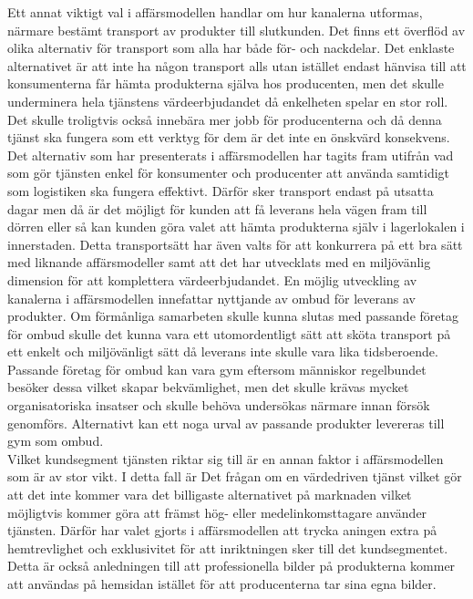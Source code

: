 \documentclass[10pt,a4paper,oneside]{article}
\begin{document}
Ett annat viktigt val i affärsmodellen handlar om hur kanalerna utformas, närmare bestämt transport av produkter till slutkunden. Det finns ett överflöd av olika alternativ för transport som alla har både för- och nackdelar. Det enklaste alternativet är att inte ha någon transport alls utan istället endast hänvisa till att konsumenterna får hämta produkterna själva hos producenten, men det skulle underminera hela tjänstens värdeerbjudandet då enkelheten spelar en stor roll. Det skulle troligtvis också innebära mer jobb för producenterna och då denna tjänst ska fungera som ett verktyg för dem är det inte en önskvärd konsekvens. Det alternativ som har presenterats i affärsmodellen har tagits fram utifrån vad som gör tjänsten enkel för konsumenter och producenter att använda samtidigt som logistiken ska fungera effektivt. Därför sker transport endast på utsatta dagar men då är det möjligt för kunden att få leverans hela vägen fram till dörren eller så kan kunden göra valet att hämta produkterna själv i lagerlokalen i innerstaden. Detta transportsätt har även valts för att konkurrera på ett bra sätt med liknande affärsmodeller samt att det har utvecklats med en miljövänlig dimension för att komplettera värdeerbjudandet. En möjlig utveckling av kanalerna i affärsmodellen innefattar nyttjande av ombud för leverans av produkter. Om förmånliga samarbeten skulle kunna slutas med passande företag för ombud skulle det kunna vara ett utomordentligt sätt att sköta transport på ett enkelt och miljövänligt sätt då leverans inte skulle vara lika tidsberoende. Passande företag för ombud kan vara gym eftersom människor regelbundet besöker dessa vilket skapar bekvämlighet, men det skulle krävas mycket organisatoriska insatser och skulle behöva undersökas närmare innan försök genomförs. Alternativt kan ett noga urval av passande produkter levereras till gym som ombud.\\

Vilket kundsegment tjänsten riktar sig till är en annan faktor i affärsmodellen som är av stor vikt. I detta fall är Det frågan om en värdedriven tjänst vilket gör att det inte kommer vara det billigaste alternativet på marknaden vilket möjligtvis kommer göra att främst hög- eller medelinkomsttagare använder tjänsten. Därför har valet gjorts i affärsmodellen att trycka aningen extra på hemtrevlighet och exklusivitet för att inriktningen sker till det kundsegmentet. Detta är också anledningen till att professionella bilder på produkterna kommer att användas på hemsidan istället för att producenterna tar sina egna bilder.
\end{document}

